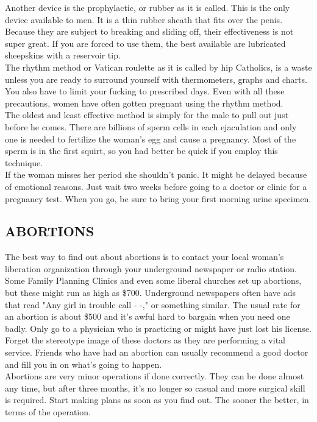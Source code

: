 \documentclass[11pt,twoside,a4paper]{book}
\begin{document}
Another device is the prophylactic, or rubber as it is called. This is the only device available to men. It is a thin rubber sheath that fits over the penis. Because they are subject to breaking and sliding off, their effectiveness is not super great. If you are forced to use them, the best available are lubricated sheepskins with a reservoir tip.~\\

The rhythm method or Vatican roulette as it is called by hip Catholics, is a waste unless you are ready to surround yourself with thermometers, graphs and charts. You also have to limit your fucking to prescribed days. Even with all these precautions, women have often gotten pregnant using the rhythm method.~\\

The oldest and least effective method is simply for the male to pull out just before he comes. There are billions of sperm cells in each ejaculation and only one is needed to fertilize the woman's egg and cause a pregnancy. Most of the sperm is in the first squirt, so you had better be quick if you employ this technique.~\\

If the woman misses her period she shouldn't panic. It might be delayed because of emotional reasons. Just wait two weeks before going to a doctor or clinic for a pregnancy test. When you go, be sure to bring your first morning urine specimen.

\subsection{ABORTIONS}

The best way to find out about abortions is to contact your local woman's liberation organization through your underground newspaper or radio station. Some Family Planning Clinics and even some liberal churches set up abortions, but these might run as high as \$700. Underground newspapers often have ads that read "Any girl in trouble call - -," or something similar. The usual rate for an abortion is about \$500 and it's awful hard to bargain when you need one badly. Only go to a physician who is practicing or might have just lost his license. Forget the stereotype image of these doctors as they are performing a vital service. Friends who have had an abortion can usually recommend a good doctor and fill you in on what's going to happen.~\\

Abortions are very minor operations if done correctly. They can be done almost any time, but after three months, it's no longer so casual and more surgical skill is required. Start making plans as soon as you find out. The sooner the better, in terms of the operation.~\\
\end{document}
